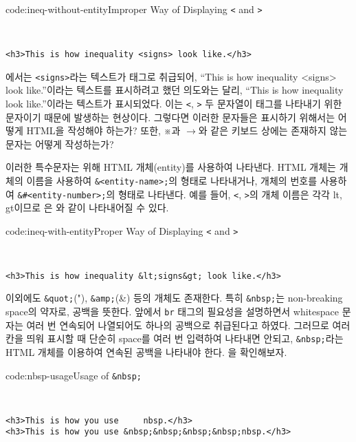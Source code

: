 \begin{codeenv}{code:ineq-without-entity}{Improper Way of Displaying \texttt{<} and \texttt{>}}\begin{verbatim}


<h3>This is how inequality <signs> look like.</h3>
\end{verbatim}
\end{codeenv}

에서는 \verb|<signs>|라는 텍스트가 태그로 취급되어, ``This is how inequality <signs> look like.''이라는 텍스트를 표시하려고 했던 의도와는 달리, ``This is how inequality look like.''이라는 텍스트가 표시되었다. 이는 \verb|<|, \verb|>| 두 문자열이 태그를 나타내기 위한 문자이기 때문에 발생하는 현상이다. 그렇다면 이러한 문자들은 표시하기 위해서는 어떻게 HTML을 작성해야 하는가? 또한, ※과 $\rightarrow$와 같은 키보드 상에는 존재하지 않는 문자는 어떻게 작성하는가?

이러한 특수문자는 위해 HTML 개체(entity)를 사용하여 나타낸다. HTML 개체는 개체의 이름을 사용하여 \verb|&<entity-name>;|의 형태로 나타내거나, 개체의 번호를 사용하여 \verb|&#<entity-number>;|의 형태로 나타낸다. 예를 들어, \verb|<|, \verb|>|의 개체 이름은 각각 lt, gt이므로 은 와 같이 나타내어질 수 있다.

\begin{codeenv}{code:ineq-with-entity}{Proper Way of Displaying \texttt{<} and \texttt{>}}\begin{verbatim}


<h3>This is how inequality &lt;signs&gt; look like.</h3>
\end{verbatim}
\end{codeenv}

이외에도 \verb|&quot;|("), \verb|&amp;|(\&) 등의 개체도 존재한다. 특히 \verb|&nbsp;|는 non-breaking space의 약자로, 공백을 뜻한다. 앞에서 \verb|br| 태그의 필요성을 설명하면서 whitespace 문자는 여러 번 연속되어 나열되어도 하나의 공백으로 취급된다고 하였다. 그러므로 여러 칸을 띄워 표시할 때 단순히 space를 여러 번 입력하여 나타내면 안되고, \verb|&nbsp;|라는 HTML 개체를 이용하여 연속된 공백을 나타내야 한다. 을 확인해보자.

\begin{codeenv}{code:nbsp-usage}{Usage of \texttt{\&nbsp;}}\begin{verbatim}


<h3>This is how you use     nbsp.</h3>
<h3>This is how you use &nbsp;&nbsp;&nbsp;&nbsp;nbsp.</h3>
\end{verbatim}
\end{codeenv}

